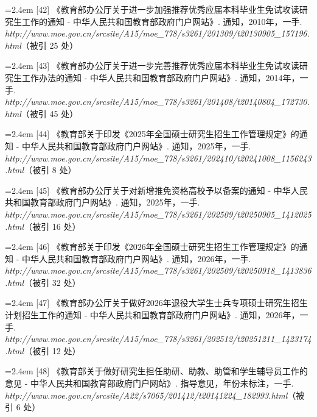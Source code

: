 {\vspace{0.6pt}
\noindent\hangindent=2.4em \label{src:S0047}{\color{cAccent}[42]} 《教育部办公厅关于进一步加强推荐优秀应届本科毕业生免试攻读研究生工作的通知 - 中华人民共和国教育部政府门户网站》. 通知，2010年，一手. \textit{http://www.moe.gov.cn/srcsite/A15/moe\_778/s3261/201309/t20130905\_157196.html}（被引 25 处）\par
\vspace{0.6pt}
\noindent\hangindent=2.4em \label{src:S0048}{\color{cAccent}[43]} 《教育部办公厅关于进一步完善推荐优秀应届本科毕业生免试攻读研究生工作办法的通知 - 中华人民共和国教育部政府门户网站》. 通知，2014年，一手. \textit{http://www.moe.gov.cn/srcsite/A15/moe\_778/s3261/201408/t20140804\_172730.html}（被引 45 处）\par
\vspace{0.6pt}
\noindent\hangindent=2.4em \label{src:S0049}{\color{cAccent}[44]} 《教育部关于印发《2025年全国硕士研究生招生工作管理规定》的通知 - 中华人民共和国教育部政府门户网站》. 通知，2025年，一手. \textit{http://www.moe.gov.cn/srcsite/A15/moe\_778/s3261/202410/t20241008\_1156243.html}（被引 8 处）\par
\vspace{0.6pt}
\noindent\hangindent=2.4em \label{src:S0050}{\color{cAccent}[45]} 《教育部办公厅关于对新增推免资格高校予以备案的通知 - 中华人民共和国教育部政府门户网站》. 通知，2025年，一手. \textit{http://www.moe.gov.cn/srcsite/A15/moe\_778/s3261/202509/t20250905\_1412025.html}（被引 16 处）\par
\vspace{0.6pt}
\noindent\hangindent=2.4em \label{src:S0051}{\color{cAccent}[46]} 《教育部关于印发《2026年全国硕士研究生招生工作管理规定》的通知 - 中华人民共和国教育部政府门户网站》. 通知，2026年，一手. \textit{http://www.moe.gov.cn/srcsite/A15/moe\_778/s3261/202509/t20250918\_1413836.html}（被引 32 处）\par
\vspace{0.6pt}
\noindent\hangindent=2.4em \label{src:S0052}{\color{cAccent}[47]} 《教育部办公厅关于做好2026年退役大学生士兵专项硕士研究生招生计划招生工作的通知 - 中华人民共和国教育部政府门户网站》. 通知，2026年，一手. \textit{http://www.moe.gov.cn/srcsite/A15/moe\_778/s3261/202512/t20251211\_1423174.html}（被引 12 处）\par
\vspace{0.6pt}
\noindent\hangindent=2.4em \label{src:S0053}{\color{cAccent}[48]} 《教育部关于做好研究生担任助研、助教、助管和学生辅导员工作的意见 - 中华人民共和国教育部政府门户网站》. 指导意见，年份未标注，一手. \textit{http://www.moe.gov.cn/srcsite/A22/s7065/201412/t20141224\_182993.html}（被引 6 处）\par
}
